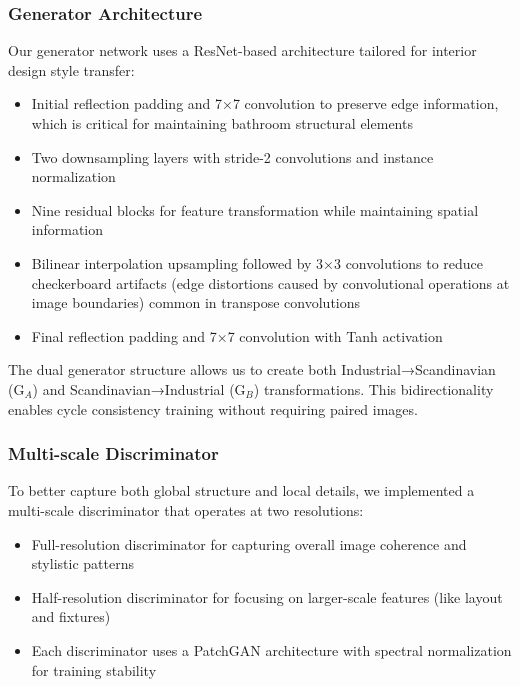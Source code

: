 \documentclass[twocolumn,superscriptaddress,aps]{revtex4-1}
\begin{document}
\subsubsection{Generator Architecture}

Our generator network uses a ResNet-based architecture tailored for interior design style transfer:

\begin{itemize}
    \item Initial reflection padding and 7×7 convolution to preserve edge information, which is critical for maintaining bathroom structural elements
    \item Two downsampling layers with stride-2 convolutions and instance normalization
    \item Nine residual blocks for feature transformation while maintaining spatial information
    \item Bilinear interpolation upsampling followed by 3×3 convolutions to reduce checkerboard artifacts (edge distortions caused by convolutional operations at image boundaries) common in transpose convolutions
    \item Final reflection padding and 7×7 convolution with Tanh activation
\end{itemize}

The dual generator structure allows us to create both Industrial→Scandinavian (G$_A$) and Scandinavian→Industrial (G$_B$) transformations. This bidirectionality enables cycle consistency training without requiring paired images.

\subsubsection{Multi-scale Discriminator}

To better capture both global structure and local details, we implemented a multi-scale discriminator that operates at two resolutions:

\begin{itemize}
    \item Full-resolution discriminator for capturing overall image coherence and stylistic patterns
    \item Half-resolution discriminator for focusing on larger-scale features (like layout and fixtures)
    \item Each discriminator uses a PatchGAN architecture with spectral \cite{miyato2018spectral} normalization for training stability
\end{itemize}
\end{document}
